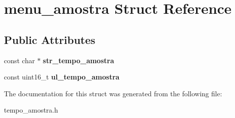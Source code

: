\hypertarget{structmenu__amostra}{\section{menu\-\_\-amostra \-Struct \-Reference}
\label{structmenu__amostra}
}
\subsection*{\-Public \-Attributes}
\begin{DoxyCompactItemize}
\item 
\hypertarget{structmenu__amostra_a16ca02f75b7bf876412fac2994fc3b1b}{const char $\ast$ {\bfseries str\-\_\-tempo\-\_\-amostra}}\label{structmenu__amostra_a16ca02f75b7bf876412fac2994fc3b1b}

\item 
\hypertarget{structmenu__amostra_ad9ca202111ebd925d90c70208e5566b4}{const uint16\-\_\-t {\bfseries ul\-\_\-tempo\-\_\-amostra}}\label{structmenu__amostra_ad9ca202111ebd925d90c70208e5566b4}

\end{DoxyCompactItemize}


\-The documentation for this struct was generated from the following file\-:\begin{DoxyCompactItemize}
\item 
tempo\-\_\-amostra.\-h\end{DoxyCompactItemize}
